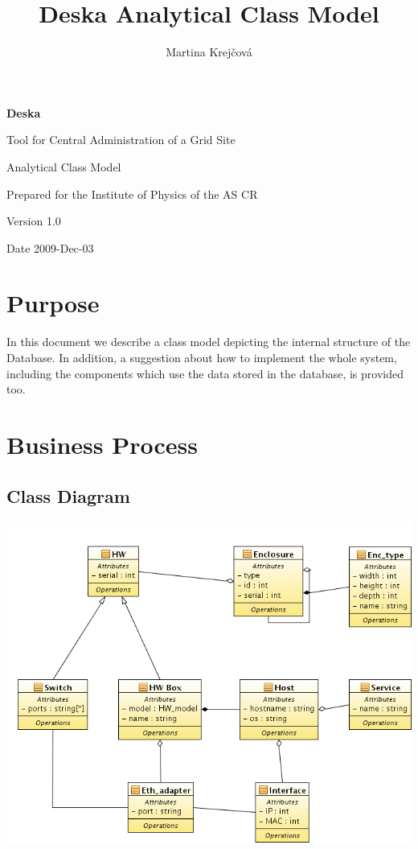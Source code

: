 \documentclass[12pt]{article}
\author{Martina Krejčová}
\title{Deska Analytical Class Model}
\begin{document}
{\Huge \textbf{Deska}}

\vspace{0.2in}

{\large Tool for Central Administration of a Grid Site}

\vspace{0.5in}

{\large Analytical Class Model}

\vspace{0.2in}

{\large Prepared for the Institute of Physics of the AS CR}

\vspace{0.2in}

{\large Version 1.0}

\vspace{0.2in}

{\large Date 2009-Dec-03}

\vspace{0.5in}

\tableofcontents

\newpage


\section{Purpose}
In this document we describe a class model depicting the internal structure of
the Database.  In addition, a suggestion about how to implement the whole
system, including the components which use the data stored in the database, is
provided too.


\section{Business Process}

\subsection{Class Diagram}
\includegraphics[width=14cm]{class_diagram.png}
\end{document}
